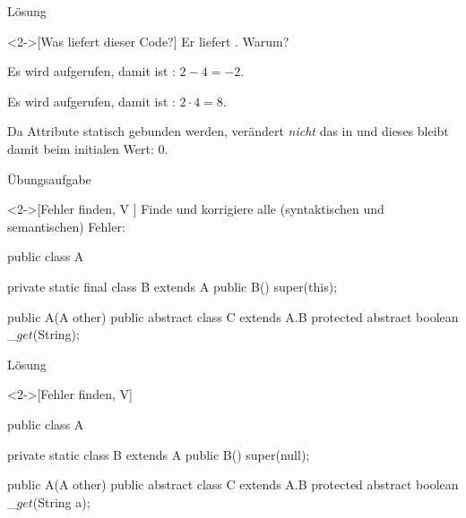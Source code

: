 \begin{frame}[c]{Lösung}
    \begin{solve}<2->[Was liefert dieser Code?]
        Er liefert . Warum?
        \begin{description}[XX:]
            \item[-2] Es wird  aufgerufen, damit ist : \(2 - 4 = -2\).
            \item[8] Es wird  aufgerufen, damit ist : \(2 \cdot 4 = 8\).
            \item[0] Da Attribute statisch gebunden werden, verändert  \emph{nicht} das  in  und dieses bleibt damit beim initialen Wert: \(0\).
        \end{description}
    \end{solve}
\end{frame}



\begin{frame}[c,fragile]{Übungsaufgabe}
    \begin{exercise}<2->[Fehler finden, V ]
        \pause{}Finde und korrigiere alle (syntaktischen und semantischen) Fehler:\pause{}
{\footnotesize
        \begin{plainvoid}
public class A {
    private static final class B extends A {
        public B() {
            super(this);
        }
    }

    public A(A other){}
    public abstract class C extends A.B {
        protected abstract boolean _$get$(String);
    }
}
        \end{plainvoid}
}
    \end{exercise}
\end{frame}

\begin{frame}[c,fragile]{Lösung}
    \begin{solve}<2->[Fehler finden, V]
        \pause{}\footnotesize\begin{plainjava}
public class A {
    private static class B extends A {
        public B() {
            super(null);
        }
    }

    public A(A other){}
    public abstract class C extends A.B {
        protected abstract boolean _$get$(String a);
    }
}
        \end{plainjava}
    \end{solve}
\end{frame}

